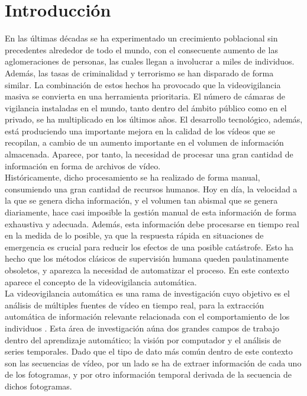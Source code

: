 \documentclass[../main.tex]{book}
\begin{document}
\chapter{Introducción}

En las últimas décadas se ha experimentado un crecimiento poblacional
sin precedentes alrededor de todo el mundo, con el consecuente aumento
de las aglomeraciones de personas, las cuales llegan a involucrar a
miles de individuos. Además, las tasas de criminalidad y terrorismo se
han disparado de forma similar. La combinación de estos hechos ha
provocado que la videovigilancia masiva se convierta en una
herramienta prioritaria. El número de cámaras de vigilancia instaladas
en el mundo, tanto dentro del ámbito público como en el privado, se ha
multiplicado en los últimos años. El desarrollo tecnológico, además,
está produciendo una importante mejora en la calidad de los vídeos que
se recopilan, a cambio de un aumento importante en el volumen de
información almacenada. Aparece, por tanto, la necesidad de procesar
una gran cantidad de información en forma de archivos de vídeo.\\

Históricamente, dicho procesamiento se ha realizado de forma manual,
consumiendo una gran cantidad de recursos humanos. Hoy en día, la
velocidad a la que se genera dicha información, y el volumen tan
abismal que se genera diariamente, hace casi imposible la gestión
manual de esta información de forma exhaustiva y adecuada. Además,
esta información debe procesarse en tiempo real en la medida de lo
posible, ya que la respuesta rápida en situaciones de emergencia es
crucial para reducir los efectos de una posible catástrofe. Esto ha
hecho que los métodos clásicos de supervisión humana queden
paulatinamente obsoletos, y aparezca la necesidad de automatizar el
proceso. En este contexto aparece el concepto de la videovigilancia
automática.\\

La videovigilancia automática es una rama de investigación cuyo
objetivo es el análisis de múltiples fuentes de vídeo en tiempo real,
para la extracción automática de información relevante relacionada con
el comportamiento de los individuos \cite{ma2009intelligent}. Esta
área de investigación aúna dos grandes campos de trabajo dentro del
aprendizaje automático; la visión por computador y el análisis de
series temporales. Dado que el tipo de dato más común dentro de este
contexto son las secuencias de vídeo, por un lado se ha de extraer
información de cada uno de los fotogramas, y por otro información
temporal derivada de la secuencia de dichos fotogramas.\\
\end{document}
